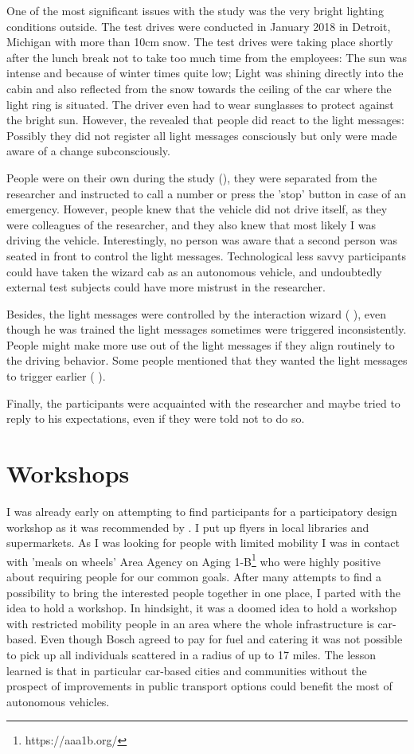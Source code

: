 One of the most significant issues with the study was the very bright lighting conditions outside. The test drives were conducted in January 2018 in Detroit, Michigan with more than 10cm snow. The test drives were taking place shortly after the lunch break not to take too much time from the employees: The sun was intense and because of winter times quite low; Light was shining directly into the cabin and also reflected from the snow towards the ceiling of the car where the light ring is situated. The driver even had to wear sunglasses to protect against the bright sun. However, the \emph{} revealed that people did react to the light messages: Possibly they did not register all light messages consciously but only were made aware of a change subconsciously. 

People were on their own during the study (\emph{}), they were separated from the researcher and instructed to call a number or press the 'stop' button in case of an emergency. However, people knew that the vehicle did not drive itself, as they were colleagues of the researcher, and they also knew that most likely I was driving the vehicle. Interestingly, no person was aware that a second person was seated in front to control the light messages. Technological less savvy participants could have taken the wizard cab as an autonomous vehicle, and undoubtedly external test subjects could have more mistrust in the researcher.

Besides, the light messages were controlled by the interaction wizard ( \emph{}), even though he was trained the light messages sometimes were triggered inconsistently. People might make more use out of the light messages if they align routinely to the driving behavior. Some people mentioned that they wanted the light messages to trigger earlier ( \emph{}). 

Finally, the participants were acquainted with the researcher and maybe tried to reply to his expectations, even if they were told not to do so. 

\section{Workshops}
I was already early on attempting to find participants for a participatory design workshop as it was recommended by \cite{Pettersson}. I put up flyers in local libraries and supermarkets. As I was looking for people with limited mobility I was in contact with 'meals on wheels' Area Agency on Aging 1-B\footnote{https://aaa1b.org/} who were highly positive about requiring people for our common goals. After many attempts to find a possibility to bring the interested people together in one place, I parted with the idea to hold a workshop. In hindsight, it was a doomed idea to hold a workshop with restricted mobility people in an area where the whole infrastructure is car-based. Even though Bosch agreed to pay for fuel and catering it was not possible to pick up all individuals scattered in a radius of up to 17 miles. The lesson learned is that in particular car-based cities and communities without the prospect of improvements in public transport options could benefit the most of autonomous vehicles. 


